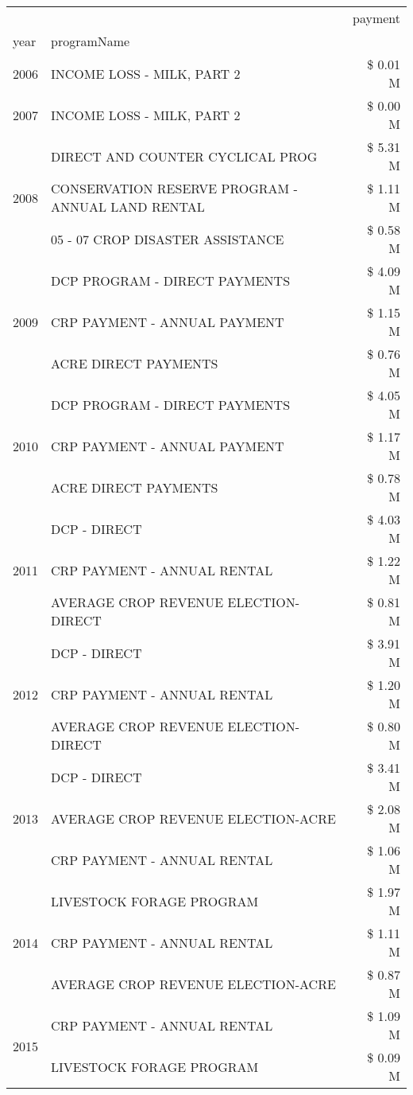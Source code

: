 \begin{tabular}{llr}
\toprule
 &  & payment \\
year & programName &  \\
\midrule
2006 & INCOME LOSS - MILK, PART 2 & \$ 0.01 M \\
\cline{1-3}
2007 & INCOME LOSS - MILK, PART 2 & \$ 0.00 M \\
\cline{1-3}
\multirow[t]{3}{*}{2008} & DIRECT AND COUNTER CYCLICAL PROG & \$ 5.31 M \\
 & CONSERVATION RESERVE PROGRAM - ANNUAL LAND RENTAL & \$ 1.11 M \\
 & 05 - 07 CROP DISASTER ASSISTANCE & \$ 0.58 M \\
\cline{1-3}
\multirow[t]{3}{*}{2009} & DCP PROGRAM - DIRECT PAYMENTS & \$ 4.09 M \\
 & CRP PAYMENT - ANNUAL PAYMENT & \$ 1.15 M \\
 & ACRE DIRECT PAYMENTS & \$ 0.76 M \\
\cline{1-3}
\multirow[t]{3}{*}{2010} & DCP PROGRAM - DIRECT PAYMENTS & \$ 4.05 M \\
 & CRP PAYMENT - ANNUAL PAYMENT & \$ 1.17 M \\
 & ACRE DIRECT PAYMENTS & \$ 0.78 M \\
\cline{1-3}
\multirow[t]{3}{*}{2011} & DCP - DIRECT & \$ 4.03 M \\
 & CRP PAYMENT - ANNUAL RENTAL & \$ 1.22 M \\
 & AVERAGE CROP REVENUE ELECTION-DIRECT & \$ 0.81 M \\
\cline{1-3}
\multirow[t]{3}{*}{2012} & DCP - DIRECT & \$ 3.91 M \\
 & CRP PAYMENT - ANNUAL RENTAL & \$ 1.20 M \\
 & AVERAGE CROP REVENUE ELECTION-DIRECT & \$ 0.80 M \\
\cline{1-3}
\multirow[t]{3}{*}{2013} & DCP - DIRECT & \$ 3.41 M \\
 & AVERAGE CROP REVENUE ELECTION-ACRE & \$ 2.08 M \\
 & CRP PAYMENT - ANNUAL RENTAL & \$ 1.06 M \\
\cline{1-3}
\multirow[t]{3}{*}{2014} & LIVESTOCK FORAGE PROGRAM & \$ 1.97 M \\
 & CRP PAYMENT - ANNUAL RENTAL & \$ 1.11 M \\
 & AVERAGE CROP REVENUE ELECTION-ACRE & \$ 0.87 M \\
\cline{1-3}
\multirow[t]{3}{*}{2015} & CRP PAYMENT - ANNUAL RENTAL & \$ 1.09 M \\
 & LIVESTOCK FORAGE PROGRAM & \$ 0.09 M \\

\end{tabular}
